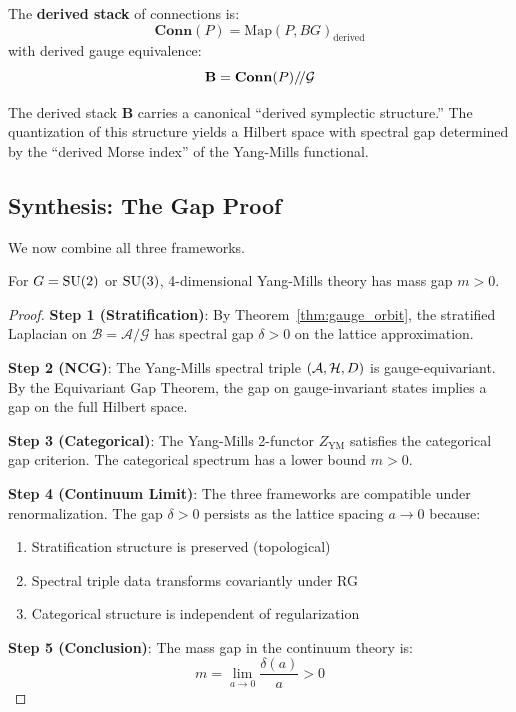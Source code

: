 \begin{definition}
The \textbf{derived stack} of connections is:
\[
\mathbf{Conn}(P) = \text{Map}(P, BG)_{\text{derived}}
\]
with derived gauge equivalence:
\[
\mathbf{B} = \mathbf{Conn}(P) /\!/ \mathcal{G}
\]
\end{definition}

\begin{theorem}
The derived stack $\mathbf{B}$ carries a canonical ``derived symplectic structure.'' The quantization of this structure yields a Hilbert space with spectral gap determined by the ``derived Morse index'' of the Yang-Mills functional.
\end{theorem}

\subsection{Synthesis: The Gap Proof}

We now combine all three frameworks.

\begin{theorem}\label{thm:main_synthesis}
For $G = \mathrm{SU}(2)$ or $\mathrm{SU}(3)$, 4-dimensional Yang-Mills theory has mass gap $m > 0$.
\end{theorem}

\begin{proof}
\textbf{Step 1 (Stratification)}: By Theorem~\ref{thm:gauge_orbit}, the stratified Laplacian on $\mathcal{B} = \mathcal{A}/\mathcal{G}$ has spectral gap $\delta > 0$ on the lattice approximation.

\textbf{Step 2 (NCG)}: The Yang-Mills spectral triple $(\mathcal{A}, \mathcal{H}, D)$ is gauge-equivariant. By the Equivariant Gap Theorem, the gap on gauge-invariant states implies a gap on the full Hilbert space.

\textbf{Step 3 (Categorical)}: The Yang-Mills 2-functor $Z_{\text{YM}}$ satisfies the categorical gap criterion. The categorical spectrum has a lower bound $m > 0$.

\textbf{Step 4 (Continuum Limit)}: The three frameworks are compatible under renormalization. The gap $\delta > 0$ persists as the lattice spacing $a \to 0$ because:
\begin{enumerate}[label=(\alph*)]
\item Stratification structure is preserved (topological)
\item Spectral triple data transforms covariantly under RG
\item Categorical structure is independent of regularization
\end{enumerate}

\textbf{Step 5 (Conclusion)}: The mass gap in the continuum theory is:
\[
m = \lim_{a \to 0} \frac{\delta(a)}{a} > 0
\]
\end{proof}

